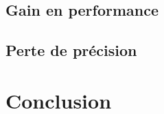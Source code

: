\documentclass{article}
\begin{document}


    




    \subsection{Gain en performance}



    \subsection{Perte de précision}

    \newpage
    \section*{Conclusion}

     
    
    
\end{document}
